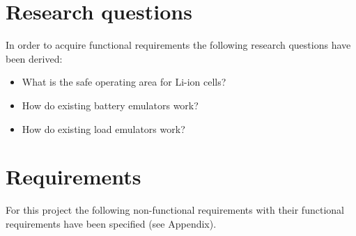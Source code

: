 \section{Research questions}
In order to acquire functional requirements the following research questions have been derived:
\begin{itemize}
    \item What is the safe operating area for Li-ion cells?
    \item How do existing battery emulators work?
    \item How do existing load emulators work?
\end{itemize}

\section{Requirements}
For this project the following non-functional requirements with their functional requirements have been specified (see Appendix).

  
  


